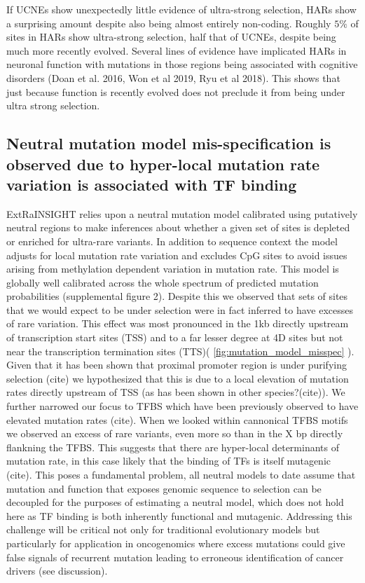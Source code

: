 \documentclass[11pt]{article}
\begin{document}
If UCNEs show unexpectedly little evidence of ultra-strong selection, HARs show a surprising amount despite also being almost entirely non-coding. Roughly $5\%$ of sites in HARs show ultra-strong selection, half that of UCNEs, despite being much more recently evolved. Several lines of evidence have implicated HARs in neuronal function with mutations in those regions being associated with cognitive disorders (Doan et al. 2016, Won et al 2019, Ryu et al 2018). This shows that just because function is recently evolved does not preclude it from being under ultra strong selection. 

\subsection*{Neutral mutation model mis-specification is observed due to hyper-local mutation rate variation is associated with TF binding}

ExtRaINSIGHT relies upon a neutral mutation model calibrated using putatively neutral regions to make inferences about whether a given set of sites is depleted or enriched for ultra-rare variants. In addition to sequence context the model adjusts for local mutation rate variation and excludes CpG sites to avoid issues arising from methylation dependent variation in mutation rate. This model is globally well calibrated across the whole spectrum of predicted mutation probabilities (supplemental figure 2). Despite this we observed that sets of sites that we would expect to be under selection were in fact inferred to have excesses of rare variation. This effect was most pronounced in the 1kb directly upstream of transcription start sites (TSS) and to a far lesser degree at 4D sites but not near the transcription termination sites (TTS)( \ref{fig:mutation_model_misspec} ). Given that it has been shown that proximal promoter region is under purifying selection (cite) we hypothesized that this is due to a local elevation of mutation rates directly upstream of TSS  (as has been shown in other species?(cite)). We further narrowed our focus to TFBS which have been previously observed to have elevated mutation rates (cite). When we looked within cannonical TFBS motifs we observed an excess of rare variants, even more so than in the X bp directly flankning the TFBS. This suggests that there are hyper-local determinants of mutation rate, in this case likely that the binding of TFs is itself mutagenic (cite). This poses a fundamental problem, all neutral models to date assume that mutation and function that exposes genomic sequence to selection can be decoupled for the purposes of estimating a neutral model, which does not hold here as TF binding is both inherently functional and mutagenic. Addressing this challenge will be critical not only for traditional evolutionary models but particularly for application in oncogenomics where excess mutations could give false signals of recurrent mutation leading to erroneous identification of cancer drivers (see discussion).
\end{document}
